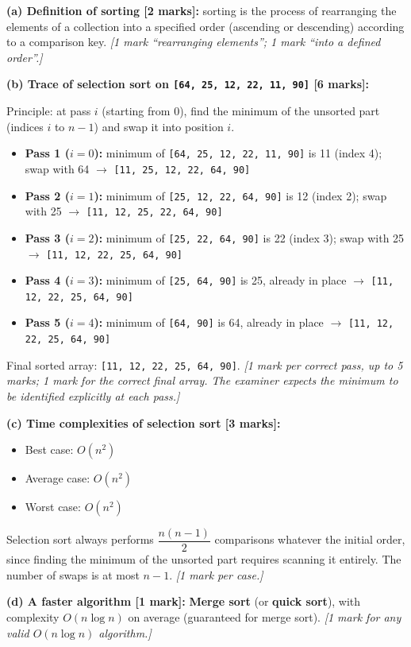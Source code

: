 \documentclass[11pt]{article}
\begin{document}
\begin{corrige}
\textbf{(a) Definition of sorting [2 marks]:} sorting is the process of rearranging the elements of a collection into a specified order (ascending or descending) according to a comparison key. \emph{[1 mark ``rearranging elements''; 1 mark ``into a defined order''.]}

\textbf{(b) Trace of selection sort on \texttt{[64, 25, 12, 22, 11, 90]} [6 marks]:}

Principle: at pass $i$ (starting from 0), find the minimum of the unsorted part (indices $i$ to $n-1$) and swap it into position $i$.
\begin{itemize}
\item \textbf{Pass 1 ($i=0$):} minimum of \texttt{[64, 25, 12, 22, 11, 90]} is 11 (index 4); swap with 64 $\to$ \texttt{[11, 25, 12, 22, 64, 90]}
\item \textbf{Pass 2 ($i=1$):} minimum of \texttt{[25, 12, 22, 64, 90]} is 12 (index 2); swap with 25 $\to$ \texttt{[11, 12, 25, 22, 64, 90]}
\item \textbf{Pass 3 ($i=2$):} minimum of \texttt{[25, 22, 64, 90]} is 22 (index 3); swap with 25 $\to$ \texttt{[11, 12, 22, 25, 64, 90]}
\item \textbf{Pass 4 ($i=3$):} minimum of \texttt{[25, 64, 90]} is 25, already in place $\to$ \texttt{[11, 12, 22, 25, 64, 90]}
\item \textbf{Pass 5 ($i=4$):} minimum of \texttt{[64, 90]} is 64, already in place $\to$ \texttt{[11, 12, 22, 25, 64, 90]}
\end{itemize}
Final sorted array: \texttt{[11, 12, 22, 25, 64, 90]}.
\emph{[1 mark per correct pass, up to 5 marks; 1 mark for the correct final array. The examiner expects the minimum to be identified explicitly at each pass.]}

\textbf{(c) Time complexities of selection sort [3 marks]:}
\begin{itemize}
\item Best case: $O(n^2)$
\item Average case: $O(n^2)$
\item Worst case: $O(n^2)$
\end{itemize}
Selection sort always performs $\dfrac{n(n-1)}{2}$ comparisons whatever the initial order, since finding the minimum of the unsorted part requires scanning it entirely. The number of swaps is at most $n-1$. \emph{[1 mark per case.]}

\textbf{(d) A faster algorithm [1 mark]:} \textbf{Merge sort} (or \textbf{quick sort}), with complexity $O(n \log n)$ on average (guaranteed for merge sort). \emph{[1 mark for any valid $O(n \log n)$ algorithm.]}
\end{corrige}
\end{document}
